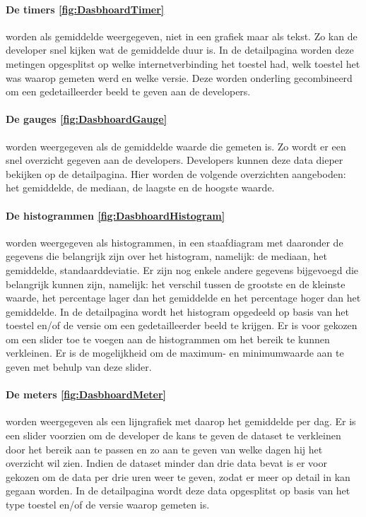 \paragraph{De timers \ref{fig:DasbhoardTimer}} worden als gemiddelde weergegeven, niet in een grafiek maar als tekst. Zo kan de developer snel kijken wat de gemiddelde duur is. In de detailpagina worden deze metingen opgesplitst op welke internetverbinding het toestel had, welk toestel het was waarop gemeten werd en welke versie. Deze worden onderling gecombineerd om een gedetailleerder beeld te geven aan de developers.\\

\paragraph{De gauges \ref{fig:DasbhoardGauge}} worden weergegeven als de gemiddelde waarde die gemeten is. Zo wordt er een snel overzicht gegeven aan de developers. Developers kunnen deze data dieper bekijken op de detailpagina. Hier worden de volgende overzichten aangeboden: het gemiddelde, de mediaan, de laagste en de hoogste waarde. \\

\paragraph{De histogrammen \ref{fig:DasbhoardHistogram}} worden weergegeven als histogrammen, in een staafdiagram met daaronder de gegevens die belangrijk zijn over het histogram, namelijk: de mediaan, het gemiddelde, standaarddeviatie. Er zijn nog enkele andere gegevens bijgevoegd die belangrijk kunnen zijn, namelijk: het verschil tussen de grootste en de kleinste waarde, het percentage lager dan het gemiddelde en het percentage hoger dan het gemiddelde. In de detailpagina wordt het histogram opgedeeld op basis van het toestel en/of de versie om een gedetailleerder beeld te krijgen.
Er is voor gekozen om een slider toe te voegen aan de histogrammen om het bereik te kunnen verkleinen. Er is de mogelijkheid om de maximum- en minimumwaarde aan te geven met behulp van deze slider. \\

\paragraph{De meters \ref{fig:DasbhoardMeter}} worden weergegeven als een lijngrafiek met daarop het gemiddelde per dag. Er is een slider voorzien om de developer de kans te geven de dataset te verkleinen door het bereik aan te passen en zo aan te geven van welke dagen hij het overzicht wil zien. Indien de dataset minder dan drie data bevat is er voor gekozen om de data per drie uren weer te geven, zodat er meer op detail in kan gegaan worden. In de detailpagina wordt deze data opgesplitst op basis van het type toestel en/of de versie waarop gemeten is. \\ 



